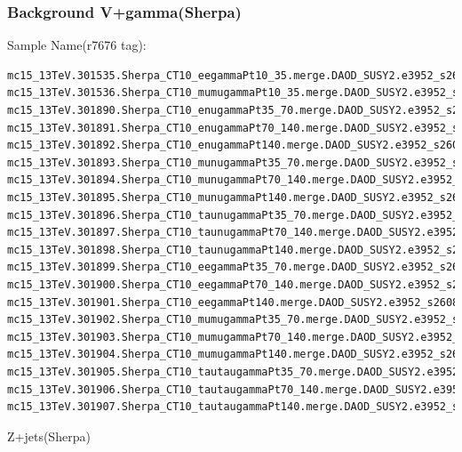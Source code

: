 \documentclass[mathserif,serif]{beamer}
\begin{document}
\begin{frame}[fragile]
\frametitle{Background V+gamma(Sherpa)}
\small
Sample Name(r7676 tag):
\tiny
\begin{verbatim}
mc15_13TeV.301535.Sherpa_CT10_eegammaPt10_35.merge.DAOD_SUSY2.e3952_s2608_s2183_r7725_r7676_p2666/
mc15_13TeV.301536.Sherpa_CT10_mumugammaPt10_35.merge.DAOD_SUSY2.e3952_s2608_s2183_r7725_r7676_p2666/
mc15_13TeV.301890.Sherpa_CT10_enugammaPt35_70.merge.DAOD_SUSY2.e3952_s2608_s2183_r7725_r7676_p2666/
mc15_13TeV.301891.Sherpa_CT10_enugammaPt70_140.merge.DAOD_SUSY2.e3952_s2608_s2183_r7725_r7676_p2666/
mc15_13TeV.301892.Sherpa_CT10_enugammaPt140.merge.DAOD_SUSY2.e3952_s2608_s2183_r7725_r7676_p2666/
mc15_13TeV.301893.Sherpa_CT10_munugammaPt35_70.merge.DAOD_SUSY2.e3952_s2608_s2183_r7725_r7676_p2666/
mc15_13TeV.301894.Sherpa_CT10_munugammaPt70_140.merge.DAOD_SUSY2.e3952_s2608_s2183_r7725_r7676_p2666/
mc15_13TeV.301895.Sherpa_CT10_munugammaPt140.merge.DAOD_SUSY2.e3952_s2608_s2183_r7725_r7676_p2666/
mc15_13TeV.301896.Sherpa_CT10_taunugammaPt35_70.merge.DAOD_SUSY2.e3952_s2608_s2183_r7725_r7676_p2666/
mc15_13TeV.301897.Sherpa_CT10_taunugammaPt70_140.merge.DAOD_SUSY2.e3952_s2608_s2183_r7725_r7676_p2666/
mc15_13TeV.301898.Sherpa_CT10_taunugammaPt140.merge.DAOD_SUSY2.e3952_s2608_s2183_r7725_r7676_p2666/
mc15_13TeV.301899.Sherpa_CT10_eegammaPt35_70.merge.DAOD_SUSY2.e3952_s2608_s2183_r7725_r7676_p2666/
mc15_13TeV.301900.Sherpa_CT10_eegammaPt70_140.merge.DAOD_SUSY2.e3952_s2608_s2183_r7725_r7676_p2666/
mc15_13TeV.301901.Sherpa_CT10_eegammaPt140.merge.DAOD_SUSY2.e3952_s2608_s2183_r7725_r7676_p2666/
mc15_13TeV.301902.Sherpa_CT10_mumugammaPt35_70.merge.DAOD_SUSY2.e3952_s2608_s2183_r7725_r7676_p2666/
mc15_13TeV.301903.Sherpa_CT10_mumugammaPt70_140.merge.DAOD_SUSY2.e3952_s2608_s2183_r7725_r7676_p2666/
mc15_13TeV.301904.Sherpa_CT10_mumugammaPt140.merge.DAOD_SUSY2.e3952_s2608_s2183_r7725_r7676_p2666/
mc15_13TeV.301905.Sherpa_CT10_tautaugammaPt35_70.merge.DAOD_SUSY2.e3952_s2608_s2183_r7725_r7676_p2666/
mc15_13TeV.301906.Sherpa_CT10_tautaugammaPt70_140.merge.DAOD_SUSY2.e3952_s2608_s2183_r7725_r7676_p2666/
mc15_13TeV.301907.Sherpa_CT10_tautaugammaPt140.merge.DAOD_SUSY2.e3952_s2608_s2183_r7725_r7676_p2666/
\end{verbatim}
\end{frame}

\begin{frame}
\begin{center}
\huge
Z+jets(Sherpa)
\end{center}
\end{frame}
\end{document}
